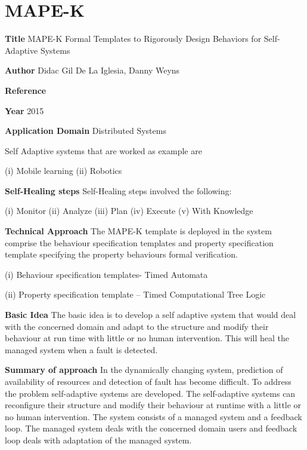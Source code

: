 \section{MAPE-K}\label{MAPE-K}
\begin{compactitem}

\item[\textbf{Title}]MAPE-K Formal Templates to Rigorously Design Behaviors for Self-Adaptive Systems

\item[\textbf{Author}]Didac Gil De La Iglesia, Danny Weyns

\item[\textbf{Reference}] 

\cite{didac_iglesia_mape-k:_2015}

\item[\textbf{Year}] 2015

\item[\textbf{Application Domain}]Distributed Systems 

Self Adaptive systems that are worked as example are

(i) Mobile learning (ii) Robotics

\item[\textbf{Self-Healing steps}] Self-Healing steps   involved the following:

(i) Monitor (ii) Analyze (iii) Plan (iv) Execute 
(v) With Knowledge

\item[\textbf{Technical Approach}]
The MAPE-K template is deployed in the system comprise the behaviour specification templates and property specification template specifying the property behaviours formal verification.

(i) Behaviour specification templates- Timed Automata

(ii) Property specification template – Timed Computational Tree Logic

\item[\textbf{Basic Idea}]  
The basic idea is to develop a self adaptive system that would deal with the concerned domain and adapt to the structure and modify their behaviour at run time with little or no human intervention. This will heal the managed system when a fault is detected.


\item[\textbf{Summary of approach}] In the dynamically changing system, prediction of availability of resources and detection of fault has become difficult. To address the problem self-adaptive systems are developed. The self-adaptive systems can reconfigure their structure and modify their behaviour at runtime with a little or no human intervention. The system consists of a managed system and a feedback loop. The managed system deals with the concerned domain users and feedback loop deals with adaptation of the managed system.


\end{compactitem}
